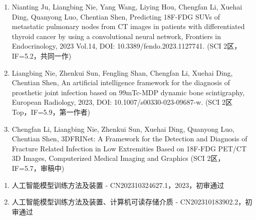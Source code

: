 \begin{publications}
    \begin{enumerate}
        \item Nianting Ju, Liangbing Nie, Yang Wang, Liying Hou, Chengfan Li, Xuehai Ding, Quanyong Luo, Chentian Shen, Predicting 18F-FDG SUVs of metastatic pulmonary nodes from CT images in patients with differentiated thyroid cancer by using a convolutional neural network, Frontiers in Endocrinology, 2023 Vol.14, DOI: 10.3389/fendo.2023.1127741. (SCI 2区，IF=5.2，共同一作)
        \item Liangbing Nie, Zhenkui Sun, Fengling Shan, Chengfan Li, Xuehai Ding, Chentian Shen, An artificial intelligence framework for the diagnosis of prosthetic joint infection based on 99mTc-MDP dynamic bone scintigraphy, European Radiology, 2023, DOI: 10.1007/s00330-023-09687-w. (SCI 2区 Top，IF=5.9，第一作者)
        \item Chengfan Li, Liangbing Nie, Zhenkui Sun, Xuehai Ding, Quanyong Luo, Chentian Shen, 3DFRINet: A Framework for the Detection and Diagnosis of Fracture Related Infection in Low Extremities Based on 18F-FDG PET/CT 3D Images, Computerized Medical Imaging and Graphics (SCI 2区，IF=5.7，审稿中)
    \end{enumerate}

    \begin{enumerate}
        \item 人工智能模型训练方法及装置 - CN202310324627.1，2023，初审通过
        \item 人工智能模型训练方法及装置、计算机可读存储介质 - CN202310183902.2，初审通过
    \end{enumerate}
\end{publications}